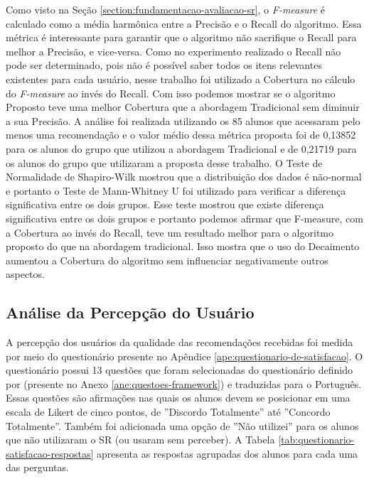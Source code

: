 Como visto na Seção \ref{section:fundamentacao-avaliacao-sr}, o \textit{F-measure} é calculado como a média harmônica entre
a Precisão e o Recall do algoritmo. Essa métrica é interessante para garantir que o algoritmo não sacrifique o Recall
para melhor a Precisão, e vice-versa. Como no experimento realizado o Recall não pode ser determinado, pois não
é possível saber todos os itens relevantes existentes para cada usuário, nesse
trabalho foi utilizado a Cobertura no cálculo do \textit{F-measure} ao invés do Recall.
Com isso podemos mostrar se o algoritmo Proposto teve uma melhor Cobertura que a abordagem Tradicional sem diminuir
a sua Precisão. A análise foi realizada utilizando os 85 alunos que acessaram pelo menos uma recomendação e o valor médio
dessa métrica proposta foi de 0,13852 para os alunos do grupo que utilizou a abordagem Tradicional e de 0,21719 para os alunos
do grupo que utilizaram a proposta desse trabalho. O Teste de Normalidade de Shapiro-Wilk mostrou que a distribuição dos
dados é não-normal e portanto o Teste de Mann-Whitney U foi utilizado para verificar a diferença significativa entre os dois
grupos. Esse teste mostrou que existe diferença significativa entre os dois grupos e portanto podemos afirmar que F-measure,
com a Cobertura ao invés do Recall, teve um resultado melhor para o algoritmo proposto do que na abordagem tradicional. Isso mostra
que o uso do Decaimento aumentou a Cobertura do algoritmo sem influenciar negativamente outros aspectos.

\subsection{Análise da Percepção do Usuário}\label{subsection:analise-questionario-satisfacao}

A percepção dos usuários da qualidade das recomendações recebidas foi medida por meio do questionário presente no
Apêndice \ref{ape:questionario-de-satisfacao}. O questionário possui 13 questões que foram selecionadas do questionário
definido por  (presente no Anexo \ref{ane:questoes-framework}) e traduzidas para o Português.
Essas questões são afirmações nas quais os alunos devem se posicionar em uma escala de
Likert de cinco pontos, de ''Discordo Totalmente'' até ''Concordo Totalmente''. Também foi adicionada uma opção de ''Não utilizei'' para
os alunos que não utilizaram o SR (ou usaram sem perceber). A Tabela \ref{tab:questionario-satisfacao-respostas}
apresenta as respostas agrupadas dos alunos para cada uma das perguntas.

